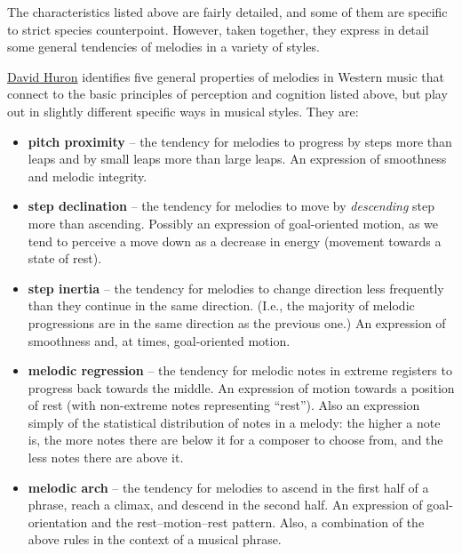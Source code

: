 \documentclass{book}
\providecommand{\tightlist}{%
  \setlength{\itemsep}{0pt}\setlength{\parskip}{0pt}}
\begin{document}
The characteristics listed above are fairly detailed, and some of them are
specific to strict species counterpoint. However, taken together, they express
in detail some general tendencies of melodies in a variety of styles.

\href{https://openlibrary.org/works/OL5851060W/Sweet_Anticipation}{David
Huron} identifies five general properties of melodies in Western music that
connect to the basic principles of perception and cognition listed above, but
play out in slightly different specific ways in musical styles. They are:

\begin{itemize}
\tightlist
\item
  \textbf{pitch proximity} -- the tendency for melodies to progress by steps
  more than leaps and by small leaps more than large leaps. An expression of
  smoothness and melodic integrity.\\
\item
  \textbf{step declination} -- the tendency for melodies to move by
  \emph{descending} step more than ascending. Possibly an expression of
  goal-oriented motion, as we tend to perceive a move down as a decrease in
  energy (movement towards a state of rest).\\
\item
  \textbf{step inertia} -- the tendency for melodies to change direction less
  frequently than they continue in the same direction. (I.e., the majority of
  melodic progressions are in the same direction as the previous one.) An
  expression of smoothness and, at times, goal-oriented motion.\\
\item
  \textbf{melodic regression} -- the tendency for melodic notes in extreme
  registers to progress back towards the middle. An expression of motion
  towards a position of rest (with non-extreme notes representing ``rest'').
  Also an expression simply of the statistical distribution of notes in a
  melody: the higher a note is, the more notes there are below it for a
  composer to choose from, and the less notes there are above it.\\
\item
  \textbf{melodic arch} -- the tendency for melodies to ascend in the first
  half of a phrase, reach a climax, and descend in the second half. An
  expression of goal-orientation and the rest--motion--rest pattern. Also, a
  combination of the above rules in the context of a musical phrase.
\end{itemize}
\end{document}
